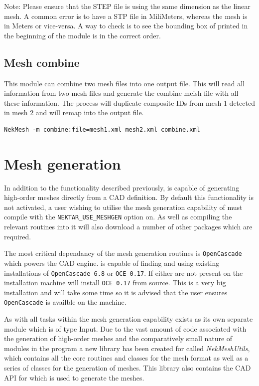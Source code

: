Note: Please ensure that the STEP file is using the same dimension as the linear mesh.
A common error is to have a STP file in MiliMeters, whereas the mesh is in Meters or 
vice-versa. A way to check is to see the bounding box of printed in the beginning of
the module is in the correct order. 

\subsection{Mesh combine}
This module can combine two mesh files into one output file.
This will read all information from two mesh files and generate the combine meish 
file with all these information. The process will duplicate composite IDs 
from mesh 1 detected in mesh 2 and will remap into the output file.

\begin{lstlisting}[style=BashInputStyle]
  NekMesh -m combine:file=mesh1.xml mesh2.xml combine.xml
\end{lstlisting}

\section{Mesh generation}

In addition to the functionality described previously, \nm is capable of
generating high-order meshes directly from a CAD definition. By default this
functionality is not activated, a user wishing to utilise the mesh generation
capability of \nm must compile \nekpp with the \texttt{NEKTAR\_USE\_MESHGEN}
option on. As well as compiling the relevant routines into \nm it will also
download a number of other packages which are required.

The most critical dependancy of the mesh generation routines is
\texttt{OpenCascade} which powers the CAD engine. \nm is capable of finding and
using existing installations of \texttt{OpenCascade 6.8} or \texttt{OCE 0.17}.
If either are not present on the installation machine \nm will install
\texttt{OCE 0.17} from source. This is a very big installation and will take
some time so it is advised that the user ensures \texttt{OpenCascade} is
availble on the machine.

As with all tasks within \nm the mesh generation capability exists as its
own separate module which is of type Input. Due to the vast amount of code
associated with the generation of high-order meshes and the comparatively small
nature of modules in the \nm program a new library has been created for \nekpp
called {\em NekMeshUtils}, which contains all the core routines and classes for
the \nm mesh format as well as a series of classes for the generation of meshes.
This library also contains the CAD API for \nekpp which is used to generate the
meshes.

